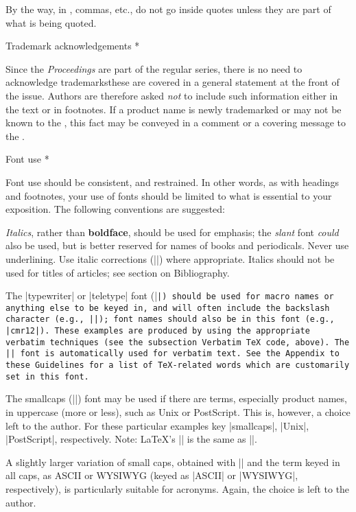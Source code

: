 By the way, in \TUB, commas, etc., do not go inside quotes unless they
are part of what is being quoted.

\subhead * Trademark acknowledgements *

Since the {\sl Proceedings\/} are part of the regular \TUB\/ series,
there is no need to acknowledge trademarks\Dash these are covered in a
general statement at the front of the issue.  Authors are therefore
asked {\it not\/} to include such information either in the text or in
footnotes.  If a product name is newly trademarked or may not be known
to the \editor, this fact may be conveyed in a comment or a covering
message to the \editor.

\subhead * Font use *

Font use should be consistent, and restrained.  In other words, as
with headings and footnotes, your use of fonts should be limited to
what is essential to your exposition.  The following conventions are
suggested:

\list[\lettered]
\item {\it Italics}, rather than {\bf boldface}, should be used for
   emphasis; the {\sl slant\/} font {\it could\/} also be used, but is
better reserved for names of books and periodicals.  Never use
underlining.  Use italic corrections (|\/|) where appropriate.
Italics should not be used for titles of articles; see section on
Bibliography.

\item The |typewriter| or |teletype| font (|\tt|) should be used for
   macro names or anything else to be keyed in, and will often include
the backslash character (e.g., |\entry|); font names should also be in
this font (e.g., |cmr12|).  These examples are produced by using the
appropriate verbatim techniques (see the subsection Verbatim \TeX\
code, above). The |\tt| font is automatically used for verbatim text.
See the Appendix to these Guidelines for a list of \TeX-related words
which are customarily set in this font.

\item The {\smc smallcaps} (|\smc|) font may be used if there are
   terms, especially product names, in uppercase (more or less), such as
   {\smc Unix} or {\smc PostScript}.  This is, however, a choice left to
   the author.  For these particular examples key |{\smc smallcaps}|,
   |{\smc Unix}|, |{\smc PostScript}|, respectively.
   Note: \LaTeX's |\sc| is the same as |\smc|.

   A slightly larger variation of small caps, obtained with
   |\SMC| and the term keyed in all caps, as {\SMC ASCII} or
   {\SMC WYSIWYG} (keyed as |{\SMC ASCII}| or |{\SMC WYSIWYG}|,
   respectively), is particularly suitable for acronyms.  Again, the
   choice is left to the author.

